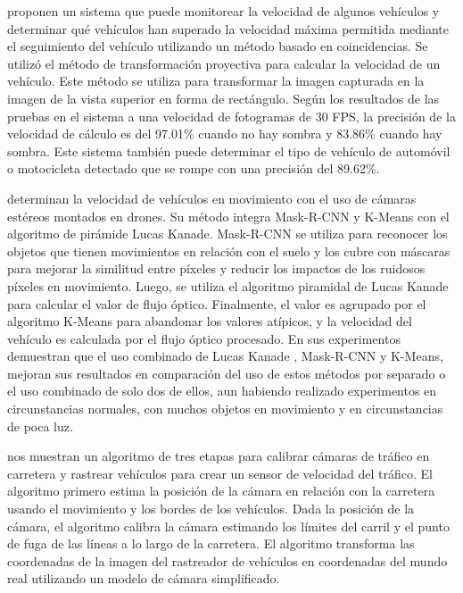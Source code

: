 \citeauthor{kurniawan2018Speed} proponen un sistema que puede monitorear la velocidad de algunos vehículos y determinar qué vehículos han superado la velocidad máxima permitida mediante el seguimiento del vehículo utilizando un método basado en coincidencias. Se utilizó el método de transformación proyectiva para calcular la velocidad de un vehículo. Este método se utiliza para transformar la imagen capturada en la imagen de la vista superior en forma de rectángulo. Según los resultados de las pruebas en el sistema a una velocidad de fotogramas de 30 FPS, la precisión de la velocidad de cálculo es del 97.01\% cuando no hay sombra y 83.86\% cuando hay sombra. Este sistema también puede determinar el tipo de vehículo de automóvil o motocicleta detectado que se rompe con una precisión del 89.62\%.


\citeauthor{peng2019Improved} determinan la velocidad de vehículos en movimiento con el uso de cámaras estéreos montados en drones. Su método integra Mask-R-CNN  y K-Means con el algoritmo de pirámide Lucas Kanade. Mask-R-CNN se utiliza para reconocer los objetos que tienen movimientos en relación con el suelo y los cubre con máscaras para mejorar la similitud entre píxeles y reducir los impactos de los ruidosos píxeles en movimiento. Luego, se utiliza el algoritmo piramidal de Lucas Kanade para calcular el valor de flujo óptico. Finalmente, el valor es agrupado por el algoritmo K-Means para abandonar los valores atípicos, y la velocidad del vehículo es calculada por el flujo óptico procesado. En sus experimentos demuestran que el uso combinado de Lucas Kanade , Mask-R-CNN y K-Means, mejoran sus resultados en comparación del uso de estos métodos por separado o el uso combinado de solo dos de ellos, aun habiendo realizado experimentos en circunstancias normales, con muchos objetos en movimiento y en circunstancias de poca luz.


\citeauthor{schoepflin2003Dynamic} nos muestran un algoritmo de tres etapas para calibrar cámaras de tráfico en carretera y rastrear vehículos para crear un sensor de velocidad del tráfico. El algoritmo primero estima la posición de la cámara en relación con la carretera usando el movimiento y los bordes de los vehículos. Dada la posición de la cámara, el algoritmo calibra la cámara estimando los límites del carril y el punto de fuga de las líneas a lo largo de la carretera. El algoritmo transforma las coordenadas de la imagen del rastreador de vehículos en coordenadas del mundo real utilizando un modelo de cámara simplificado.


